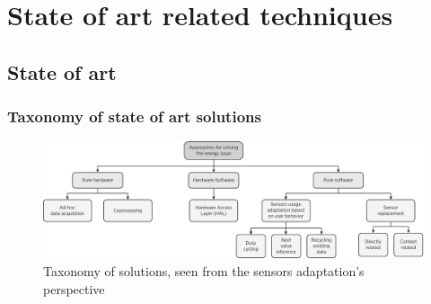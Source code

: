 \documentclass[compress,9pt,xcolor={dvipsnames,table}]{beamer}
\begin{document}
\section[State-of-art]{State of art related techniques}
\subsection{State of art}



\begin{frame}\frametitle{Taxonomy of state of art solutions}


\begin{figure}[tb]
  \centering
  \includegraphics[width=\textwidth]{../../../resources/images/vectors/approaches-taxonomy}
  \caption{Taxonomy of solutions, seen from the sensors adaptation's perspective}
  \label{fig:taxonomy}
\end{figure}
\end{frame}
\end{document}

